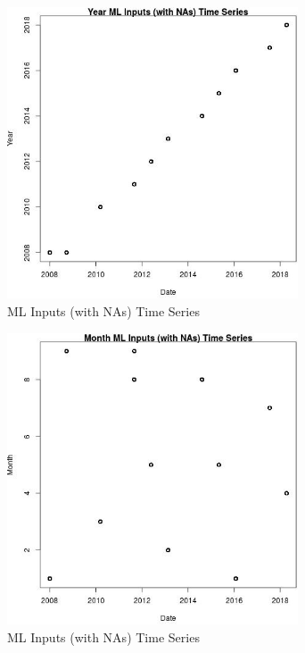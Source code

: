 \begin{figure} 
\centering  
\includegraphics[width=0.77\textwidth]{Code_Outputs/Report_ML_input_PM25_Step4_part_e_de_duplicated_aves_compiled_2019-05-18wNAs_YearvDate.jpg} 
\caption{\label{fig:Report_ML_input_PM25_Step4_part_e_de_duplicated_aves_compiled_2019-05-18wNAsYearvDate}ML Inputs (with NAs) Time Series} 
\end{figure} 
 

\begin{figure} 
\centering  
\includegraphics[width=0.77\textwidth]{Code_Outputs/Report_ML_input_PM25_Step4_part_e_de_duplicated_aves_compiled_2019-05-18wNAs_MonthvDate.jpg} 
\caption{\label{fig:Report_ML_input_PM25_Step4_part_e_de_duplicated_aves_compiled_2019-05-18wNAsMonthvDate}ML Inputs (with NAs) Time Series} 
\end{figure} 
 

